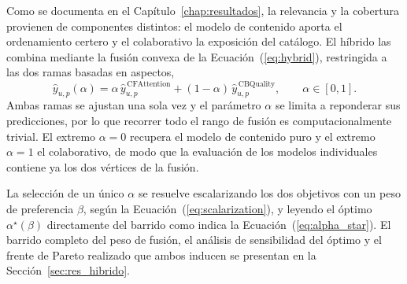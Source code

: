 Como se documenta en el Capítulo~\ref{chap:resultados}, la relevancia y la cobertura provienen
de componentes distintos: el modelo de contenido aporta el ordenamiento certero y el
colaborativo la exposición del catálogo. El híbrido las combina mediante la fusión convexa de la
Ecuación~(\ref{eq:hybrid}), restringida a las dos ramas basadas en aspectos,
\begin{equation}\label{eq:hybrid_final}
	\hat{y}_{u,p}(\alpha) = \alpha\, \hat{y}^{\,\mathrm{CFAttention}}_{u,p} + (1 - \alpha)\, \hat{y}^{\,\mathrm{CBQuality}}_{u,p},
	\qquad \alpha \in [0, 1].
\end{equation}
Ambas ramas se ajustan una sola vez y el parámetro $\alpha$ se limita a reponderar sus
predicciones, por lo que recorrer todo el rango de fusión es computacionalmente trivial. El
extremo $\alpha = 0$ recupera el modelo de contenido puro y el extremo $\alpha = 1$ el
colaborativo, de modo que la evaluación de los modelos individuales contiene ya los dos
vértices de la fusión.

La selección de un único $\alpha$ se resuelve escalarizando los dos objetivos con un peso de
preferencia $\beta$, según la Ecuación~(\ref{eq:scalarization}), y leyendo el óptimo
$\alpha^{\star}(\beta)$ directamente del barrido como indica la
Ecuación~(\ref{eq:alpha_star}). El barrido completo del peso de fusión, el análisis de
sensibilidad del óptimo y el frente de Pareto realizado que ambos inducen se presentan en la
Sección~\ref{sec:res_hibrido}.
